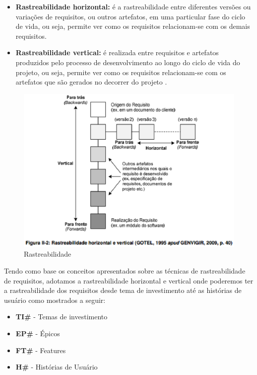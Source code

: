 \begin{itemize}
	\item \textbf{Rastreabilidade horizontal:} é a rastreabilidade entre diferentes versões ou variações de requisitos, ou outros
	artefatos, em uma particular fase do ciclo de vida, ou seja, permite ver como os requisitos relacionam-se com os demais
	requisitos.
	\item \textbf{Rastreabilidade vertical:} é realizada entre requisitos e artefatos produzidos pelo processo de desenvolvimento
	 ao longo do ciclo de vida do projeto, ou seja, permite ver como os requisitos relacionam-se com os artefatos que são gerados
	  no decorrer do projeto \cite{genvigir2009}.
\end{itemize}
\newpage
\begin{figure}[h]
	\centering
	\includegraphics[keepaspectratio=true,scale=0.9]{figuras/Rastreabilidade_Horizontal_vertical.eps}
	\caption{Rastreabilidade}
	\label{fig06}
\end{figure}

Tendo como base os conceitos apresentados sobre as técnicas de rastreabilidade de requisitos, adotamos a rastreabilidade
 horizontal e vertical onde poderemos ter a rastreabilidade dos requisitos desde tema de investimento até as histórias de
  usuário como mostrados a seguir:

\begin{itemize}
	\item \textbf{TI\#} - Temas de investimento
	\item \textbf{EP\#} - Épicos
	\item \textbf{FT\#} - Features
	\item \textbf{H\#} - Histórias de Usuário
\end{itemize}

